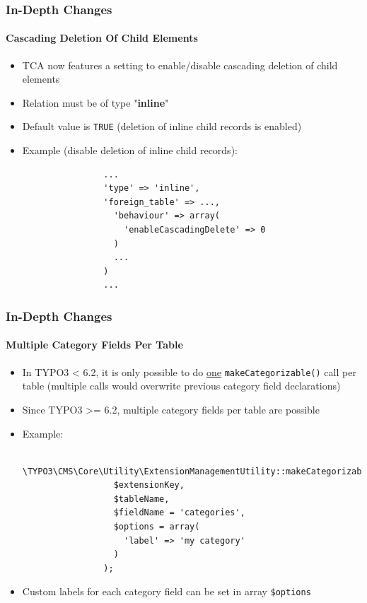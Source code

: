 
\begin{frame}[fragile]
	\frametitle{In-Depth Changes}
	\framesubtitle{Cascading Deletion Of Child Elements}

	\begin{itemize}
		\item TCA now features a setting to enable/disable cascading deletion of child elements
		\item Relation must be of type "\textbf{inline}"
		\item Default value is \texttt{TRUE} (deletion of inline child records is enabled)
		\item Example (disable deletion of inline child records):

			\begin{lstlisting}
				...
				'type' => 'inline',
				'foreign_table' => ...,
				  'behaviour' => array(
				    'enableCascadingDelete' => 0
				  )
				  ...
				)
				...
			\end{lstlisting}

	\end{itemize}

\end{frame}


\begin{frame}[fragile]
	\frametitle{In-Depth Changes}
	\framesubtitle{Multiple Category Fields Per Table}

	\begin{itemize}
		\item In TYPO3 < 6.2, it is only possible to do \underline{one} \texttt{makeCategorizable()} call per table
			(multiple calls would overwrite previous category field declarations)
		\item Since TYPO3 >= 6.2, multiple category fields per table are possible
		\item Example:

			\begin{lstlisting}
				\TYPO3\CMS\Core\Utility\ExtensionManagementUtility::makeCategorizable(
				  $extensionKey,
				  $tableName,
				  $fieldName = 'categories',
				  $options = array(
				  	'label' => 'my category'
				  )
				);
			\end{lstlisting}

		\item Custom labels for each category field can be set in array \texttt{\$options}

	\end{itemize}

\end{frame}

